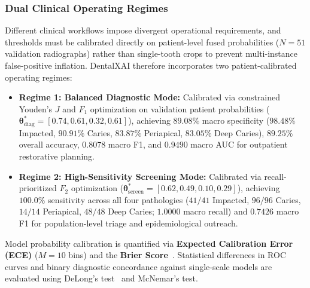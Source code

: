 \documentclass[review]{elsarticle}
\begin{document}
\subsubsection{Dual Clinical Operating Regimes}
Different clinical workflows impose divergent operational requirements, and thresholds must be calibrated directly on patient-level fused probabilities ($N=51$ validation radiographs) rather than single-tooth crops to prevent multi-instance false-positive inflation. DentalXAI therefore incorporates two patient-calibrated operating regimes:
\begin{itemize}
    \item \textbf{Regime 1: Balanced Diagnostic Mode:} Calibrated via constrained Youden's $J$ and $F_1$ optimization on validation patient probabilities ($\boldsymbol{\theta}^*_{\text{diag}} = [0.74, 0.61, 0.32, 0.61]$), achieving $89.08\%$ macro specificity ($98.48\%$ Impacted, $90.91\%$ Caries, $83.87\%$ Periapical, $83.05\%$ Deep Caries), $89.25\%$ overall accuracy, $0.8078$ macro F1, and $0.9490$ macro AUC for outpatient restorative planning.
    \item \textbf{Regime 2: High-Sensitivity Screening Mode:} Calibrated via recall-prioritized $F_2$ optimization ($\boldsymbol{\theta}^*_{\text{screen}} = [0.62, 0.49, 0.10, 0.29]$), achieving $100.0\%$ sensitivity across all four pathologies ($41/41$ Impacted, $96/96$ Caries, $14/14$ Periapical, $48/48$ Deep Caries; $1.0000$ macro recall) and $0.7426$ macro F1 for population-level triage and epidemiological outreach.
\end{itemize}
Model probability calibration is quantified via \textbf{Expected Calibration Error (ECE)} ($M=10$ bins) and the \textbf{Brier Score}~\cite{guo2017calibration}. Statistical differences in ROC curves and binary diagnostic concordance against single-scale models are evaluated using DeLong's test~\cite{delong1988comparing} and McNemar's test.
\end{document}
